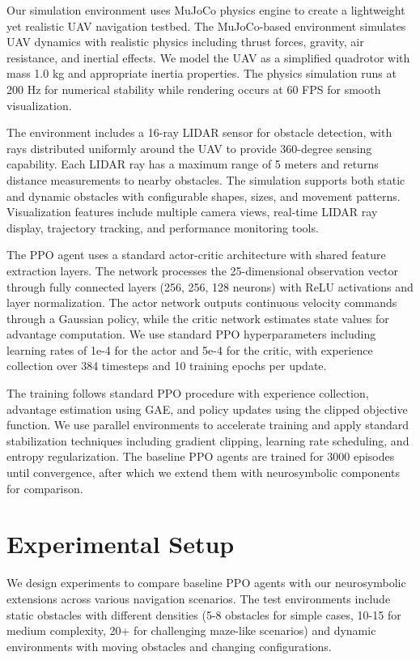 \documentclass[pdflatex,sn-mathphys-num]{sn-jnl}
\theoremstyle{thmstyleone}%
\theoremstyle{thmstyletwo}%
\theoremstyle{thmstylethree}%
\begin{document}
Our simulation environment uses MuJoCo physics engine to create a lightweight yet realistic UAV navigation testbed. The MuJoCo-based environment simulates UAV dynamics with realistic physics including thrust forces, gravity, air resistance, and inertial effects. We model the UAV as a simplified quadrotor with mass 1.0 kg and appropriate inertia properties. The physics simulation runs at 200 Hz for numerical stability while rendering occurs at 60 FPS for smooth visualization.

The environment includes a 16-ray LIDAR sensor for obstacle detection, with rays distributed uniformly around the UAV to provide 360-degree sensing capability. Each LIDAR ray has a maximum range of 5 meters and returns distance measurements to nearby obstacles. The simulation supports both static and dynamic obstacles with configurable shapes, sizes, and movement patterns. Visualization features include multiple camera views, real-time LIDAR ray display, trajectory tracking, and performance monitoring tools.

The PPO agent uses a standard actor-critic architecture with shared feature extraction layers. The network processes the 25-dimensional observation vector through fully connected layers (256, 256, 128 neurons) with ReLU activations and layer normalization. The actor network outputs continuous velocity commands through a Gaussian policy, while the critic network estimates state values for advantage computation. We use standard PPO hyperparameters including learning rates of 1e-4 for the actor and 5e-4 for the critic, with experience collection over 384 timesteps and 10 training epochs per update.



The training follows standard PPO procedure with experience collection, advantage estimation using GAE, and policy updates using the clipped objective function. We use parallel environments to accelerate training and apply standard stabilization techniques including gradient clipping, learning rate scheduling, and entropy regularization. The baseline PPO agents are trained for 3000 episodes until convergence, after which we extend them with neurosymbolic components for comparison.



\section{Experimental Setup}

We design experiments to compare baseline PPO agents with our neurosymbolic extensions across various navigation scenarios. The test environments include static obstacles with different densities (5-8 obstacles for simple cases, 10-15 for medium complexity, 20+ for challenging maze-like scenarios) and dynamic environments with moving obstacles and changing configurations.
\end{document}
